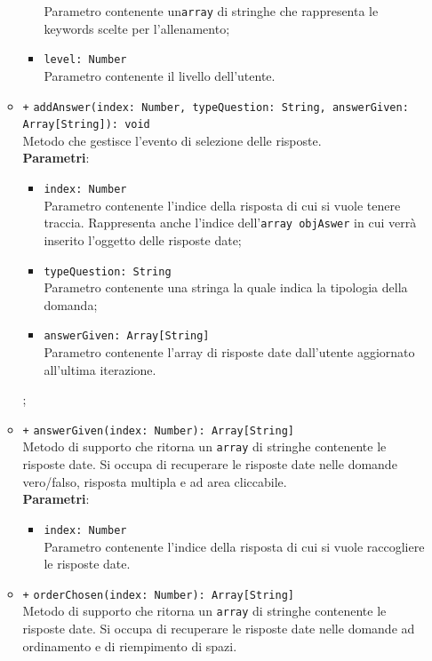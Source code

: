 \begin{itemize}
\begin{itemize}
\begin{itemize}
			Parametro contenente un\texttt{array} di stringhe che rappresenta le keywords scelte per l'allenamento;
			\item \texttt{level: Number} \\
			Parametro contenente il livello dell'utente.
		\end{itemize}
		\item \texttt{+} \texttt{addAnswer(index: Number, typeQuestion: String, answerGiven: Array[String]): void} \\
		Metodo che gestisce l'evento di selezione delle risposte. \\
		\textbf{Parametri}:
		\begin{itemize}
			\item \texttt{index: Number} \\
			Parametro contenente l'indice della risposta di cui si vuole tenere traccia. Rappresenta anche l'indice dell'\texttt{array objAswer} in cui verrà inserito l'oggetto delle risposte date;
			\item \texttt{typeQuestion: String} \\
			Parametro contenente una stringa la quale indica la tipologia della domanda;
			\item \texttt{answerGiven: Array[String]} \\
			Parametro contenente l'array di risposte date dall'utente aggiornato all'ultima iterazione.
		\end{itemize};
		\item \texttt{+} \texttt{answerGiven(index: Number): Array[String]} \\
		Metodo di supporto che ritorna un \texttt{array} di stringhe contenente le risposte date. Si occupa di recuperare le risposte date nelle domande vero/falso, risposta multipla e ad area cliccabile.\\
		\textbf{Parametri}:
		\begin{itemize}
			\item \texttt{index: Number} \\
			Parametro contenente l'indice della risposta di cui si vuole raccogliere le risposte date. 
		\end{itemize}
		\item \texttt{+} \texttt{orderChosen(index: Number): Array[String]} \\
		Metodo di supporto che ritorna un \texttt{array} di stringhe contenente le risposte date. Si occupa di recuperare le risposte date nelle domande ad ordinamento e di riempimento di spazi.\\

\end{itemize}
\end{itemize}

